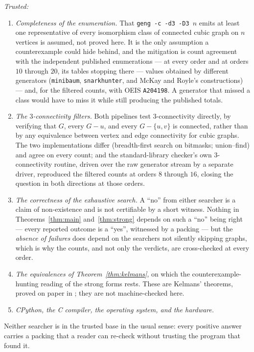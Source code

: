 \documentclass[11pt]{amsart}
\theoremstyle{plain}
\theoremstyle{definition}
\theoremstyle{remark}
\begin{document}
\emph{Trusted:}
\begin{enumerate}
\item \emph{Completeness of the enumeration.} That
\texttt{geng -c -d3 -D3 $n$} emits at least one representative of every
isomorphism class of connected cubic graph on $n$ vertices is assumed,
not proved here. It is the only assumption a counterexample could hide
behind, and the mitigation is count agreement with the independent
published enumerations --- \cite{BGM11} at every order and \cite{McKR86}
at orders $10$ through $20$, its tables stopping there ---
values obtained by different generators (\texttt{minibaum},
\texttt{snarkhunter}, and McKay and Royle's constructions) --- and, for
the filtered counts, with OEIS \texttt{A204198}. A generator that missed
a class would have to miss it while still producing the published totals.
\item \emph{The $3$-connectivity filters.} Both pipelines test
$3$-connectivity directly, by verifying that $G$, every $G-u$, and every
$G-\{u,v\}$ is connected, rather than by any equivalence between vertex
and edge connectivity for cubic graphs. The two implementations differ
(breadth-first search on bitmasks; union--find) and agree on every count;
and the standard-library checker's own $3$-connectivity routine, driven
over the raw generator stream by a separate driver, reproduced the
filtered counts at orders $8$ through $16$, closing the question in both
directions at those orders.
\item \emph{The correctness of the exhaustive search.} A ``no'' from
either searcher is a claim of non-existence and is not certifiable by a
short witness. Nothing in Theorems~\ref{thm:main} and~\ref{thm:strong}
depends on such a ``no'' being right --- every reported outcome is a
``yes'', witnessed by a packing --- but the \emph{absence of failures}
does depend on the searchers not silently skipping graphs, which is why
the counts, and not only the verdicts, are cross-checked at every order.
\item \emph{The equivalences of Theorem~\ref{thm:kelmans}}, on which the
counterexample-hunting reading of the strong forms rests. These are
Kelmans' theorems, proved on paper in \cite{Kel11}; they are not
machine-checked here.
\item \emph{CPython, the C compiler, the operating system, and the
hardware.}
\end{enumerate}

\noindent Neither searcher is in the trusted base in the usual sense:
every positive answer carries a packing that a reader can re-check
without trusting the program that found it.
\end{document}
